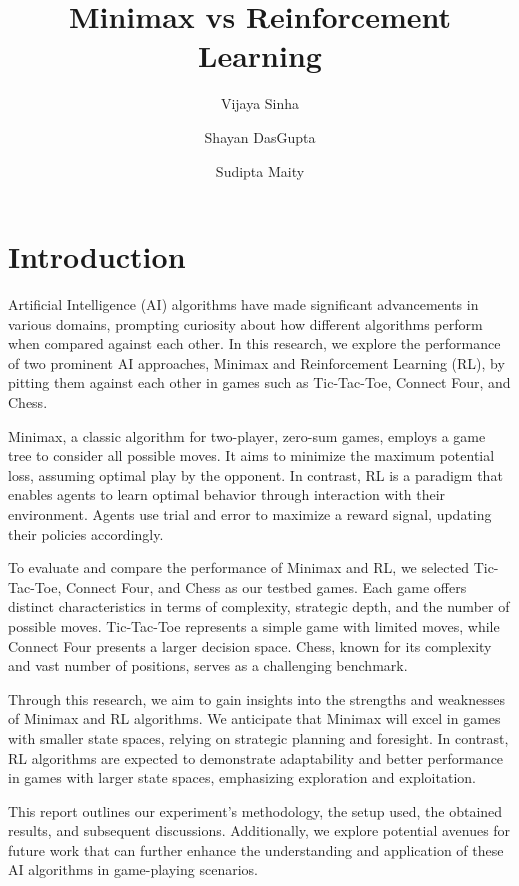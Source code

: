 \documentclass{article}
\title{Minimax vs Reinforcement Learning}
\author{Vijaya Sinha \and Shayan DasGupta \and Sudipta Maity}
\begin{document}
\maketitle

\newpage
\section{Introduction}

Artificial Intelligence (AI) algorithms have made significant advancements in various domains, prompting curiosity about how different algorithms perform when compared against each other. In this research, we explore the performance of two prominent AI approaches, Minimax and Reinforcement Learning (RL), by pitting them against each other in games such as Tic-Tac-Toe, Connect Four, and Chess.

Minimax, a classic algorithm for two-player, zero-sum games, employs a game tree to consider all possible moves. It aims to minimize the maximum potential loss, assuming optimal play by the opponent. In contrast, RL is a paradigm that enables agents to learn optimal behavior through interaction with their environment. Agents use trial and error to maximize a reward signal, updating their policies accordingly.

To evaluate and compare the performance of Minimax and RL, we selected Tic-Tac-Toe, Connect Four, and Chess as our testbed games. Each game offers distinct characteristics in terms of complexity, strategic depth, and the number of possible moves. Tic-Tac-Toe represents a simple game with limited moves, while Connect Four presents a larger decision space. Chess, known for its complexity and vast number of positions, serves as a challenging benchmark.

Through this research, we aim to gain insights into the strengths and weaknesses of Minimax and RL algorithms. We anticipate that Minimax will excel in games with smaller state spaces, relying on strategic planning and foresight. In contrast, RL algorithms are expected to demonstrate adaptability and better performance in games with larger state spaces, emphasizing exploration and exploitation.

This report outlines our experiment's methodology, the setup used, the obtained results, and subsequent discussions. Additionally, we explore potential avenues for future work that can further enhance the understanding and application of these AI algorithms in game-playing scenarios.

\newpage
\end{document}
